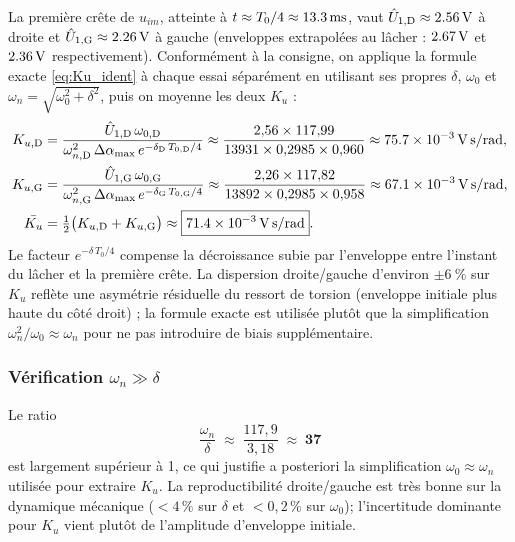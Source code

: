 La première crête de \(u_{im}\), atteinte à \(t \approx T_0/4 \approx \SI{13{,}3}{ms}\), vaut \(\hat U_{1,\text{D}} \approx \SI{2{,}56}{V}\) à droite et \(\hat U_{1,\text{G}} \approx \SI{2{,}26}{V}\) à gauche (enveloppes extrapolées au lâcher : \(\SI{2{,}67}{V}\) et \(\SI{2{,}36}{V}\) respectivement). Conformément à la consigne, on applique la formule exacte \eqref{eq:Ku_ident} à chaque essai séparément en utilisant ses propres \(\delta\), \(\omega_0\) et \(\omega_n = \sqrt{\omega_0^2 + \delta^2}\), puis on moyenne les deux \(K_u\) :
\begin{align*}
K_{u,\text{D}}
&= \frac{\hat U_{1,\text{D}}\,\omega_{0,\text{D}}}{\omega_{n,\text{D}}^2\,\Delta\alpha_{\max}\,e^{-\delta_{\text{D}}\,T_{0,\text{D}}/4}}
\approx \frac{2{,}56\times 117{,}99}{13931\times 0{,}2985\times 0{,}960}
\approx \SI{75{,}7e-3}{V.s/rad}, \\
K_{u,\text{G}}
&= \frac{\hat U_{1,\text{G}}\,\omega_{0,\text{G}}}{\omega_{n,\text{G}}^2\,\Delta\alpha_{\max}\,e^{-\delta_{\text{G}}\,T_{0,\text{G}}/4}}
\approx \frac{2{,}26\times 117{,}82}{13892\times 0{,}2985\times 0{,}958}
\approx \SI{67{,}1e-3}{V.s/rad}, \\
\bar{K_u}
&= \tfrac{1}{2}\bigl(K_{u,\text{D}} + K_{u,\text{G}}\bigr) \approx \boxed{\SI{71{,}4e-3}{V.s/rad}}.
\end{align*}
Le facteur \(e^{-\delta\,T_0/4}\) compense la décroissance subie par l'enveloppe entre l'instant du lâcher et la première crête. La dispersion droite/gauche d'environ \(\pm\SI{6}{\%}\) sur \(K_u\) reflète une asymétrie résiduelle du ressort de torsion (enveloppe initiale plus haute du côté droit) ; la formule exacte est utilisée plutôt que la simplification \(\omega_n^2/\omega_0 \approx \omega_n\) pour ne pas introduire de biais supplémentaire.

\subsubsection{Vérification \texorpdfstring{\(\omega_n \gg \delta\)}{wn >> delta}}

Le ratio
\[
\frac{\omega_n}{\delta} \;\approx\; \frac{117{,}9}{3{,}18} \;\approx\; \mathbf{37}
\]
est largement supérieur à 1, ce qui justifie a posteriori la simplification \(\omega_0 \approx \omega_n\) utilisée pour extraire \(K_u\). La reproductibilité droite/gauche est très bonne sur la dynamique mécanique (\(<\!4\,\%\) sur \(\delta\) et \(<\!0{,}2\,\%\) sur \(\omega_0\)); l'incertitude dominante pour \(K_u\) vient plutôt de l'amplitude d'enveloppe initiale.

